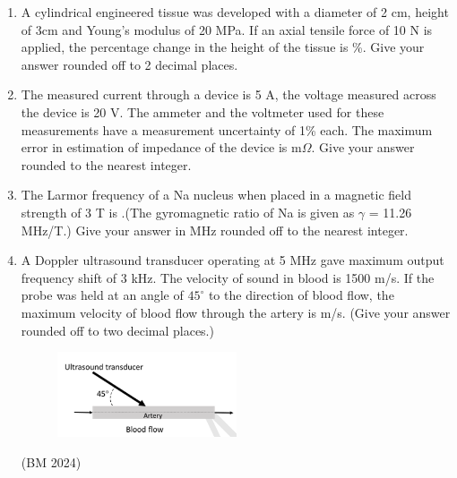 \documentclass[a4paper,12pt]{exam}
\numberwithin{equation}{enumi}
\numberwithin{figure}{enumi}
\begin{document}
\begin{enumerate}
\item A cylindrical engineered tissue was developed with a diameter of 2 cm, height of 3cm and Young’s modulus of 20 MPa. If an axial tensile force of 10 N is applied, the percentage change in the height of the tissue is \underline{\hspace{1cm}}\%. Give your answer rounded off to 2 decimal places.

\hfill{}

\item The measured current through a device is 5 A, the voltage measured across the  device is 20 V. The ammeter and the voltmeter used for these measurements have  a measurement uncertainty of 1\% each. The maximum error in estimation of   impedance of the device is \underline{\hspace{1.5cm}} m$\Omega$. Give your answer rounded to the nearest 
integer. 

\hfill{}

\item The Larmor frequency of a Na nucleus when placed in a magnetic field strength of 3 T is \underline{\hspace{2cm}}.(The gyromagnetic ratio of Na is given as $\gamma$ = 11.26 MHz/T.)   Give your answer in MHz rounded off to the nearest integer.

\hfill{}

\item A Doppler ultrasound transducer operating at 5 MHz gave maximum output  frequency shift of 3 kHz. The velocity of sound in blood is 1500 m/s. If the probe was held at an angle of $45^\circ$ to the direction of blood flow, the maximum velocity of  blood flow through the artery is \underline{\hspace{0.75cm}} m/s. (Give your answer rounded off to two 
decimal places.)


\begin{figure}[h]
\hspace{5cm}
\includegraphics[width=0.5\textwidth]{figs/Q34.png}
\label{fig:Q34.png}
\end{figure}
\hfill(BM 2024)
\vspace{3cm}


\end{enumerate}
\end{document}
